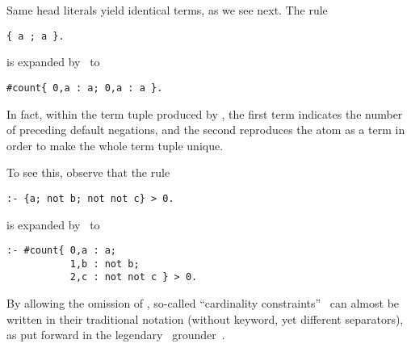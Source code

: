 Same head literals yield identical terms, as we see next.
The rule
\begin{lstlisting}[numbers=none]
{ a ; a }.
\end{lstlisting}
is expanded by \gringo\ to
\begin{lstlisting}[numbers=none]
#count{ 0,a : a; 0,a : a }.
\end{lstlisting}

In fact, within the term tuple produced by \gringo,
the first term indicates the number of preceding default negations,
and the second reproduces the atom as a term in order to make the whole term tuple unique.

To see this, observe that the rule
\begin{lstlisting}[numbers=none]
:- {a; not b; not not c} > 0.
\end{lstlisting}
is expanded by \gringo\ to
\begin{lstlisting}[numbers=none]
:- #count{ 0,a : a;
           1,b : not b;
           2,c : not not c } > 0.
\end{lstlisting}

\begin{note}
By allowing the omission of ,
so-called ``cardinality constraints''~\cite{siniso02a}
can almost be written in their traditional notation (without keyword, yet different separators),
as put forward in the legendary \lparse\ grounder~\cite{lparseManual}.
\end{note}

